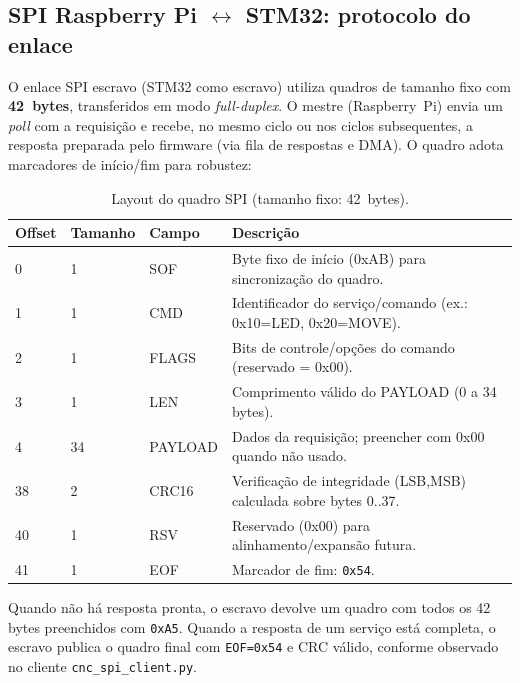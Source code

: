 \subsection*{SPI Raspberry Pi \texorpdfstring{$\leftrightarrow$}{<->} STM32: protocolo do enlace}

O enlace SPI escravo (STM32 como escravo) utiliza quadros de tamanho fixo com \textbf{42~bytes},
transferidos em modo \emph{full-duplex}. O mestre (Raspberry~Pi) envia um
\emph{poll} com a requisição e recebe, no mesmo ciclo ou nos ciclos subsequentes,
a resposta preparada pelo firmware (via fila de respostas e DMA). O quadro adota
marcadores de início/fim para robustez:

\begin{table}[h]
  \centering
  \caption{Layout do quadro SPI (tamanho fixo: 42~bytes).}
  \label{tab:spi-frame}
  \setlength{\tabcolsep}{4pt}\footnotesize
  \begin{tabularx}{\textwidth}{lllX}
    \toprule
    Offset & Tamanho & Campo & Descrição \\
    \midrule
    0 & 1 & SOF & Byte fixo de in\'icio (0xAB) para sincroniza\c{c}\~ao do quadro.\\
    1 & 1 & CMD & Identificador do servi\c{c}o/comando (ex.: 0x10=LED, 0x20=MOVE). \\
    2 & 1 & FLAGS & Bits de controle/op\c{c}\~oes do comando (reservado = 0x00). \\
    3 & 1 & LEN & Comprimento v\'alido do PAYLOAD (0 a 34 bytes). \\
    4 & 34 & PAYLOAD & Dados da requisi\c{c}\~ao; preencher com 0x00 quando n\~ao usado. \\
    38 & 2 & CRC16 & Verifica\c{c}\~ao de integridade (LSB,MSB) calculada sobre bytes 0..37. \\
    40 & 1 & RSV & Reservado (0x00) para alinhamento/expans\~ao futura. \\
    41 & 1 & EOF & Marcador de fim: \texttt{0x54}. \\
    \bottomrule
  \end{tabularx}
\end{table}

Quando não há resposta pronta, o escravo devolve um quadro com todos os
42 bytes preenchidos com \texttt{0xA5}.
Quando a resposta de um serviço está completa, o escravo publica o quadro final
com \texttt{EOF=0x54} e CRC válido, conforme observado no cliente \texttt{cnc\_spi\_client.py}.


